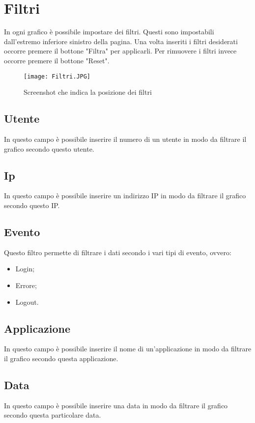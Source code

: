 \section{Filtri}
In ogni grafico è possibile impostare dei filtri. Questi sono impostabili dall'estremo inferiore sinistro della pagina. Una volta inseriti i filtri desiderati occorre premere il bottone "Filtra" per applicarli. Per rimuovere i filtri invece occorre premere il bottone "Reset".

\begin{figure}[H]
    \texttt{[image: Filtri.JPG]}
    \caption{Screenshot che indica la posizione dei filtri}
\end{figure}

\subsection{Utente}
In questo campo è possibile inserire il numero di un utente in modo da filtrare il grafico secondo questo utente.

\subsection{Ip}
In questo campo è possibile inserire un indirizzo IP in modo da filtrare il grafico secondo questo IP.

\subsection{Evento}
Questo filtro permette di filtrare i dati secondo i vari tipi di evento, ovvero:
\begin{itemize}
  \item Login;
  \item Errore;
  \item Logout.
\end{itemize}

\subsection{Applicazione}
In questo campo è possibile inserire il nome di un'applicazione in modo da filtrare il grafico secondo questa applicazione.

\subsection{Data}
In questo campo è possibile inserire una data in modo da filtrare il grafico secondo questa particolare data.

